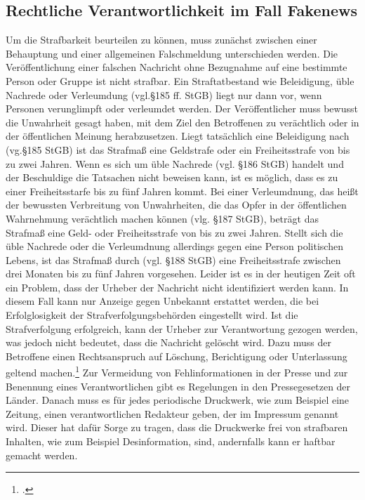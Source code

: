 \documentclass[Thesis.tex]{subfiles}
\begin{document}
\subsection{Rechtliche Verantwortlichkeit im Fall Fakenews}
Um die Strafbarkeit beurteilen zu können, muss zunächst zwischen einer Behauptung
 und einer allgemeinen Falschmeldung unterschieden werden. Die Veröffentlichung
einer falschen Nachricht ohne Bezugnahme auf eine bestimmte Person oder Gruppe
ist nicht strafbar. Ein Straftatbestand wie Beleidigung, üble Nachrede oder
Verleumdung (vgl.\S 185 ff. StGB)
liegt nur dann vor, wenn Personen verunglimpft oder verleumdet
werden. Der Veröffentlicher muss bewusst die Unwahrheit gesagt haben,
mit dem  Ziel den Betroffenen zu verächtlich oder in der öffentlichen
Meinung herabzusetzen.
Liegt tatsächlich eine Beleidigung nach (vg.\S 185 StGB) ist das Strafmaß eine Geldstrafe
oder ein Freiheitsstrafe von bis zu zwei Jahren. Wenn es sich um üble Nachrede (vgl. \S 186 StGB)
handelt und der Beschuldige die Tatsachen nicht beweisen kann, ist es möglich, dass es zu einer
Freiheitsstarfe bis zu fünf Jahren kommt. Bei einer Verleumdnung, das heißt der bewussten Verbreitung von Unwahrheiten,
die das Opfer in der öffentlichen Wahrnehmung verächtlich machen können (vlg. \S 187 StGB), beträgt das Strafmaß eine Geld-
oder Freiheitsstrafe von bis zu zwei Jahren. Stellt sich die üble Nachrede oder die Verleumdnung allerdings gegen eine Person
politischen Lebens, ist das Strafmaß durch (vgl. \S 188 StGB) eine Freiheitsstrafe zwischen drei Monaten bis zu fünf Jahren vorgesehen.
Leider ist es in der heutigen Zeit oft ein Problem, dass der Urheber der Nachricht nicht 
identifiziert werden kann. In diesem Fall kann nur Anzeige gegen Unbekannt 
erstattet werden, die bei Erfolglosigkeit der Strafverfolgungsbehörden eingestellt 
wird.
Ist die Strafverfolgung erfolgreich, kann der Urheber zur Verantwortung gezogen werden, was jedoch nicht bedeutet,
dass die Nachricht gelöscht wird. Dazu muss der Betroffene einen Rechtsanspruch auf Löschung,
Berichtigung oder Unterlassung geltend machen.\footcite{DBWDUmgangmitFakenews} %
Zur Vermeidung von Fehlinformationen in der Presse und zur Benennung eines
Verantwortlichen gibt es Regelungen in den Pressegesetzen der Länder.
Danach muss es für jedes periodische Druckwerk, wie zum Beispiel eine Zeitung,
einen verantwortlichen Redakteur geben, der im Impressum genannt wird. Dieser hat dafür
Sorge zu tragen, dass die Druckwerke frei von strafbaren Inhalten, wie zum Beispiel Desinformation,
sind, andernfalls kann er haftbar gemacht werden.
\end{document}
